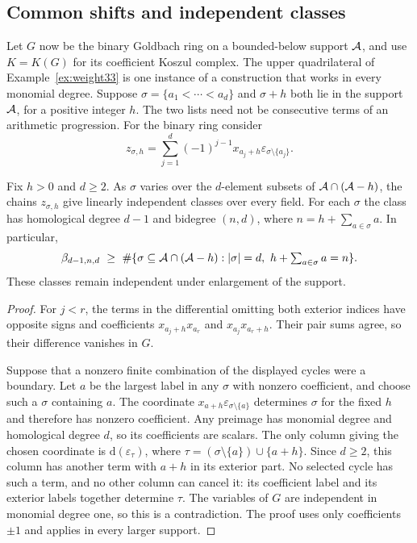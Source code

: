 \subsection{Common shifts and independent classes}
\label{sec:translations}
Let $G$ now be the binary Goldbach ring on a bounded-below support
$\mathcal A$, and use $K=K(G)$ for its coefficient Koszul complex.
The upper quadrilateral of Example~\ref{ex:weight33} is one instance
of a construction that works in every monomial degree.
Suppose $\sigma=\{a_1<\cdots<a_d\}$ and $\sigma+h$ both lie in the support
$\mathcal A$, for a positive integer $h$. The two lists need not be consecutive
terms of an arithmetic progression. For the binary ring consider
\begin{equation}\label{eq:translated-cycle}
 z_{\sigma,h}=\sum_{j=1}^d(-1)^{j-1}x_{a_j+h}
       \varepsilon_{\sigma\setminus\{a_j\}}.
\end{equation}

\begin{theorem}\label{thm:translation}
Fix $h>0$ and $d\ge2$. As $\sigma$ varies over the $d$-element subsets of
$\mathcal A\cap(\mathcal A-h)$, the chains $z_{\sigma,h}$ give linearly independent classes
over every field. For each $\sigma$ the class has homological degree $d-1$
and bidegree $(n,d)$, where $n=h+\sum_{a\in \sigma}a$. In particular,
\[
 \beta_{d-1,n,d}\ \ge\
 \#\{\sigma\subseteq\mathcal A\cap(\mathcal A-h): |\sigma|=d,\ h+\textstyle\sum_{a\in \sigma}a=n\}.
\]
These classes remain independent under enlargement of the support.
\end{theorem}
\begin{proof}
For $j<r$, the terms in the differential omitting both exterior
indices have opposite signs and coefficients $x_{a_j+h}x_{a_r}$
and $x_{a_j}x_{a_r+h}$. Their pair sums agree, so their
difference vanishes in $G$.

Suppose that a nonzero finite combination of the displayed cycles
were a boundary. Let $a$ be the largest label in any $\sigma$ with nonzero
coefficient, and choose such a $\sigma$ containing $a$. The coordinate
$x_{a+h}\varepsilon_{\sigma\setminus\{a\}}$ determines $\sigma$ for the fixed
$h$ and therefore has nonzero coefficient. Any preimage has monomial degree
and homological degree $d$, so its coefficients are scalars. The only
column giving the chosen coordinate is $\mathrm{d}(\varepsilon_\tau)$, where $\tau=(\sigma\setminus\{a\})\cup\{a+h\}$.
Since $d\ge2$, this column has another term with $a+h$ in its
exterior part. No selected cycle has such a term, and no other column
can cancel it: its coefficient label and its exterior labels together
determine $\tau$. The variables of $G$ are independent in monomial degree one,
so this is a contradiction. The proof uses only coefficients $\pm1$
and applies in every larger support.
\end{proof}

